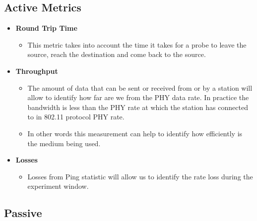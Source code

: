 \subsection*{Active Metrics}

\begin{itemize}
	\item \textbf{Round Trip Time}
	\begin{itemize}
		\item This metric takes into account the time it takes for a probe to leave the source, reach the destination and come back to the source. 
	\end{itemize}
	
	\item \textbf{Throughput}
	\begin{itemize}
		\item The amount of data that can be sent or received from or by a station will allow to identify how far are we from the PHY data rate. In practice the bandwidth is less than the PHY rate at which the station has connected to in 802.11 protocol PHY rate.
		\item In other words this measurement can help to identify how efficiently is the medium being used.
	\end{itemize}
	\item \textbf{Losses}
	\begin{itemize}
		\item Losses from Ping statistic will allow us to identify the rate loss during the experiment window.
	\end{itemize}
\end{itemize}

\subsection*{Passive}


